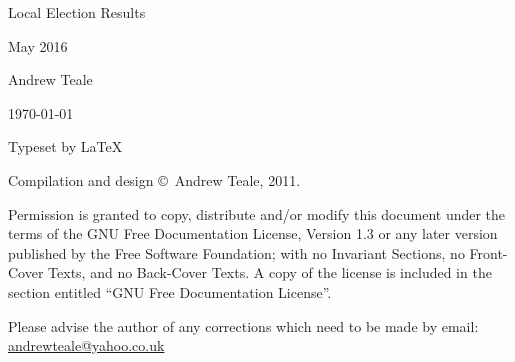 \documentclass[a4paper,openany]{book}
\begin{document}

\begin{titlepage}

\begin{center}

\Huge Local Election Results

May 2016

\bigskip

\Large Andrew Teale

\vfill

\newcommand\versionno{0.10.1}


\today

\end{center}

\end{titlepage}


\begin{center}

\bigskip

Typeset by \LaTeX{}

\bigskip

Compilation and design \copyright\ Andrew Teale, 2011.

    Permission is granted to copy, distribute and/or modify this document
    under the terms of the GNU Free Documentation License, Version 1.3
    or any later version published by the Free Software Foundation;
    with no Invariant Sections, no Front-Cover Texts, and no Back-Cover Texts.
    A copy of the license is included in the section entitled ``GNU
    Free Documentation License''.

\bigskip


\bigskip

Please advise the author of any corrections which need to be made by
email: \url{andrewteale@yahoo.co.uk}

\vfill
\end{center}

\tableofcontents


\end{document}
